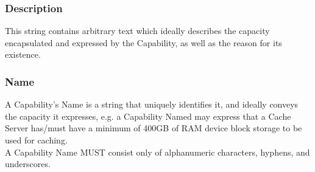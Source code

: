 \subsubsection{Description}
This string contains arbitrary text which ideally describes the capacity
encapsulated and expressed by the Capability, as well as the reason for its
existence.

\subsubsection{Name}
A Capability's Name is a string that uniquely identifies it, and ideally
conveys the capacity it expresses, e.g. a Capability Named  may
express that a Cache Server has/must have a minimum of 400GB of RAM device
block storage to be used for caching.\\
A Capability Name MUST consist only of alphanumeric characters, hyphens, and
underscores.


